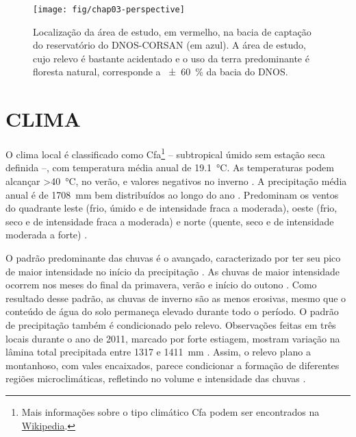 \begin{figure}[!ht]
\centering
\texttt{[image: fig/chap03-perspective]}
\caption[Localização da área de estudo na bacia do DNOS.]{Localização da área de estudo, em vermelho, na bacia 
de captação do reservatório do DNOS-CORSAN (em azul). A área de estudo, cujo relevo é bastante acidentado e o 
uso da terra predominante é floresta natural, corresponde a \SI{\pm60}{\percent} da bacia do DNOS.}
\label{fig:chap03-perspective}
\end{figure}

\section{CLIMA}
\label{sec:chap03-clima}

\def\footcfa{\footnote{Mais informações sobre o tipo climático Cfa podem ser encontrados na 
\href{https://pt.wikipedia.org/wiki/Clima_subtropical_\%C3\%BAmido}{Wikipedia}.}}

O clima local é classificado como Cfa\footcfa{} -- subtropical úmido sem estação seca definida --, com 
temperatura média anual de \SI{19,1}{\celsius}. As temperaturas podem alcançar \SI{>40}{\celsius}, no verão, e 
valores negativos no inverno \cite{HeldweinEtAl2009}. A precipitação média anual é de \SI{1708}{\milli\metre} 
bem distribuídos ao longo do ano \cite{Maluf2000}. Predominam os ventos do quadrante leste (frio, úmido e de 
intensidade fraca a moderada), oeste (frio, seco e de intensidade fraca a moderada) e norte (quente, seco e de 
intensidade moderada a forte) \cite{HeldweinEtAl2009}.

O padrão predominante das chuvas é o avançado, caracterizado por ter seu pico de maior intensidade no início 
da 
precipitação \cite{MehlEtAl2001}. As chuvas de maior intensidade ocorrem nos meses do final da primavera, 
verão e início do outono \cite{MouraBueno2012}. Como resultado desse padrão, as chuvas de inverno são as 
menos erosivas, mesmo que o conteúdo de água do solo permaneça elevado durante todo o período. O padrão de 
precipitação também é condicionado pelo relevo. Observações feitas em três locais durante o ano de \num{2011}, 
marcado por forte estiagem, mostram variação na lâmina total precipitada entre \num{1317} e \SI{1411}{\mm} 
\cite{MouraBueno2012}. Assim, o relevo plano a montanhoso, com vales encaixados, parece condicionar a formação 
de diferentes regiões microclimáticas, refletindo no volume e intensidade das chuvas \cite{MouraBueno2012}.

